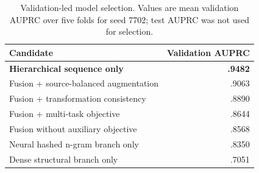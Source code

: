 \begin{table}[t]
  \centering
  \caption{Validation-led model selection. Values are mean validation AUPRC over five folds for
  seed 7702; test AUPRC was not used for selection.}
  \label{tab:model-selection}
  \scriptsize
  \setlength{\tabcolsep}{3.2pt}
  \begin{tabular}{@{}lr@{}}
    \toprule
    Candidate & Validation AUPRC \\
    \midrule
    \textbf{Hierarchical sequence only} & \textbf{.9482} \\
    Fusion + source-balanced augmentation & .9063 \\
    Fusion + transformation consistency & .8890 \\
    Fusion + multi-task objective & .8644 \\
    Fusion without auxiliary objective & .8568 \\
    Neural hashed n-gram branch only & .8350 \\
    Dense structural branch only & .7051 \\
    \bottomrule
  \end{tabular}
\end{table}

